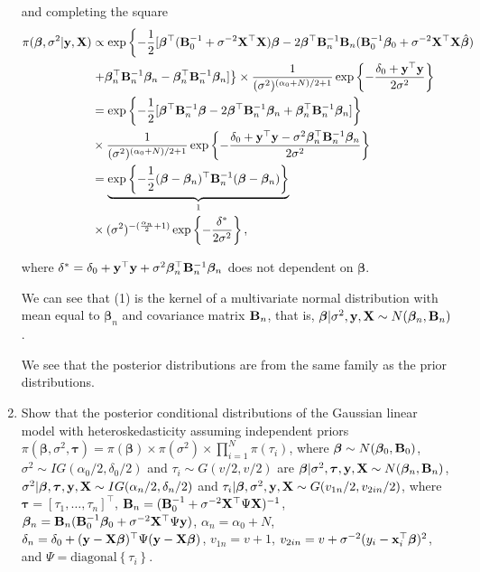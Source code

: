 \begin{enumerate}[leftmargin=*]
and completing the square
\begin{align*}
	\pi(\bm{\beta}, \sigma^2|{\bf{y}}, {\bf{X}}) & \propto \exp\left\{-\frac{1}{2}[\bm{\beta}^{\top}({\bf{B}}_0^{-1}+\sigma^{-2} {\bf{X}}^{\top}{\bf{X}})\bm{\beta}-2\bm{\beta}^{\top}{\bf{B}}_n^{-1}{\bf{B}}_n({\bf{B}}_0^{-1}\bm{\beta}_0+\sigma^{-2}{\bf{X}}^{\top}{\bf{X}}\hat{\bm{\beta}})\right.\\
	&\left.+\bm{\beta}^{\top}_n{\bf{B}}_n^{-1}\bm{\beta}_n-\bm{\beta}_n^{\top}{\bf{B}}_n^{-1}\bm{\beta}_n]\right\}\times\frac{1}{(\sigma^2)^{(\alpha_0+N)/2+1}}\exp\left\{-\frac{\delta_0+{\bf{y}}^{\top}{\bf{y}}}{2\sigma^2}\right\}\\
	&=\exp\left\{-\frac{1}{2}[\bm{\beta}^{\top}{\bf{B}}_n^{-1}\bm{\beta}-2\bm{\beta}^{\top}{\bf{B}}_n^{-1}\bm{\beta}_n+\bm{\beta}_n^{\top}{\bf{B}}_n^{-1}\bm{\beta}_n]\right\}\\
	& \times\frac{1}{(\sigma^2)^{(\alpha_0+N)/2+1}}\exp\left\{-\frac{\delta_0+{\bf{y}}^{\top}{\bf{y}}-\sigma^2\bm{\beta}_n^{\top}{\bf{B}}_n^{-1}\bm{\beta}_n}{2\sigma^2}\right\}\\
	&=\underbrace{\exp\left\{-\frac{1}{2}(\bm{\beta}-\bm{\beta}_n)^{\top}{\bf{B}}_n^{-1}(\bm{\beta}-\bm{\beta}_n)\right\}}_1\\
	&\times(\sigma^2)^{-(\frac{\alpha_n}{2}+1)}\exp\left\{-\frac{\delta^{\ast}}{2\sigma^2}\right\},
\end{align*}

where $\delta^{\ast}=\delta_0+{\bf{y}}^{\top}{\bf{y}}+\sigma^2\bm{\beta}^{\top}_n{\bf{B}}_n^{-1}\bm{\beta}_n$ does not dependent on $\bm{\beta}$.

We can see that (1) is the kernel of a multivariate normal distribution with mean equal to $\bm{\beta}_n$ and covariance matrix ${\bf{B}}_n$, that is, $\bm{\beta}|\sigma^2,{\bf{y}},{\bf{X}}\sim N(\bm{\beta}_n,{\bf{B}}_n)$. 

We see that the posterior distributions are from the same family as the prior distributions.

\item Show that the posterior conditional distributions of the Gaussian linear model with heteroskedasticity assuming independent priors $\pi(\bm{\beta},\sigma^2,\bm{\tau})=\pi(\bm{\beta})\times\pi(\sigma^2)\times\prod_{i=1}^N\pi(\tau_i)$, where $\bm{\beta} \sim N(\bm{\beta}_0, {\bf{B}}_0)$, $\sigma^2 \sim IG(\alpha_0/2, \delta_0/2)$ and $\tau_i\sim G(v/2,v/2)$ are $\bm{\beta}|\sigma^2,\bm{\tau},{\bf{y}},{\bf{X}}\sim N(\bm{\beta}_n,{\bf{B}}_n)$, $\sigma^2|\bm{\beta},\bm{\tau},{\bf{y}},{\bf{X}}\sim IG(\alpha_n/2,\delta_n/2)$ and $\tau_i|\bm{\beta},\sigma^2,{\bf{y}},{\bf{X}}\sim G(v_{1n}/2,v_{2in}/2)$, where $\bm{\tau}=[\tau_1,\dots,\tau_n]^{\top}$, ${\bf{B}}_n=({\bf{B}}_0^{-1}+\sigma^{-2}{{\bf{X}}}^{\top}\Psi{{\bf{X}}})^{-1}$, $\bm{\beta}_n={\bf{B}}_n({\bf{B}}_0^{-1}\bm{\beta}_0+\sigma^{-2}{\bf{X}}^{\top}\Psi{\bf{y}})$, $\alpha_n=\alpha_0+N$, $\delta_n=\delta_0+({\bf{y}}-{\bf{X}}\bm{\beta})^{\top}\Psi({\bf{y}}-{\bf{X}}\bm{\beta})$, $v_{1n}=v+1$, $v_{2in}=v+\sigma^{-2}(y_i-{\bf{x}}_i^{\top}\bm{\beta})^2$, and $\Psi=\text{diagonal}\left\{\tau_i\right\}$.


\end{enumerate}

